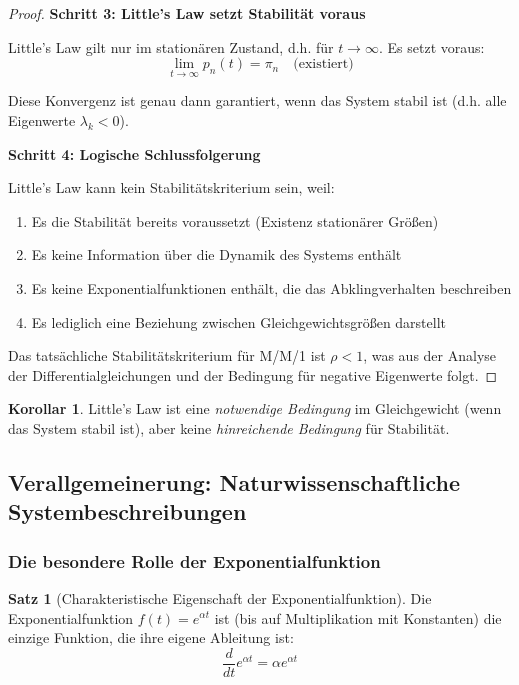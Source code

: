 ﻿\documentclass[a4paper,12pt]{scrreprt}
\theoremstyle{definition}
\newtheorem{satz}{Satz}[section]
\newtheorem{korollar}{Korollar}[section]
\begin{document}
\begin{proof}
	\textbf{Schritt 3: Little's Law setzt Stabilität voraus}
	
	Little's Law gilt nur im stationären Zustand, d.h. für $t \to \infty$. Es setzt voraus:
	\begin{equation}
		\lim_{t \to \infty} p_n(t) = \pi_n \quad \text{(existiert)}
	\end{equation}
	
	Diese Konvergenz ist genau dann garantiert, wenn das System stabil ist (d.h. alle Eigenwerte $\lambda_k < 0$). 
	
	\textbf{Schritt 4: Logische Schlussfolgerung}
	
	Little's Law kann kein Stabilitätskriterium sein, weil:
	\begin{enumerate}
		\item[-] Es die Stabilität bereits voraussetzt (Existenz stationärer Größen)
		\item[-] Es keine Information über die Dynamik des Systems enthält
		\item[-] Es keine Exponentialfunktionen enthält, die das Abklingverhalten beschreiben
		\item[-] Es lediglich eine Beziehung zwischen Gleichgewichtsgrößen darstellt
	\end{enumerate}
	
	Das tatsächliche Stabilitätskriterium für M/M/1 ist $\rho < 1$, was aus der Analyse der Differentialgleichungen und der Bedingung für negative Eigenwerte folgt.
\end{proof}

\begin{korollar}
	Little's Law ist eine \textit{notwendige Bedingung} im Gleichgewicht (wenn das System stabil ist), aber keine \textit{hinreichende Bedingung} für Stabilität.
\end{korollar}

\subsection{Verallgemeinerung: Naturwissenschaftliche Systembeschreibungen}

\subsubsection{Die besondere Rolle der Exponentialfunktion}

\begin{satz}[Charakteristische Eigenschaft der Exponentialfunktion]
	Die Exponentialfunktion $f(t) = e^{\alpha t}$ ist (bis auf Multiplikation mit Konstanten) die einzige Funktion, die ihre eigene Ableitung ist:
	\begin{equation}
		\frac{d}{dt} e^{\alpha t} = \alpha e^{\alpha t}
	\end{equation}
\end{satz}
\end{document}
